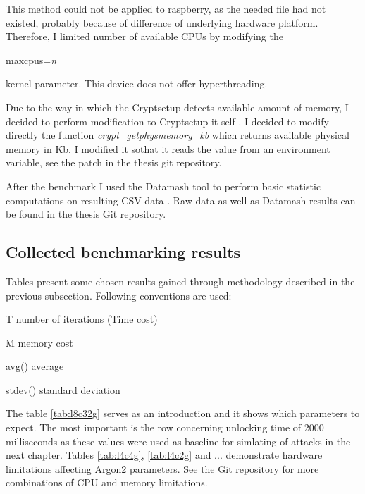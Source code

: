 \documentclass[nolof]{fithesis3}
\begin{document}
This method could not be applied to raspberry, as the needed file had not existed, probably because of difference of underlying hardware platform. Therefore, I limited number of available CPUs by modifying the 
\begin{tt}
maxcpus=\emph{n}
\end{tt}
 kernel parameter. This device does not offer hyperthreading.

Due to the way in which the Cryptsetup detects available amount of memory, I decided to perform modification to Cryptsetup it self \parencite{cryptsetuputils}. I decided to modify directly the function \emph{crypt\_getphysmemory\_kb} which returns available physical memory in Kb. I modified it sothat it reads the value from an environment variable, see the patch in the thesis git repository.

After the benchmark I used the Datamash tool to perform basic statistic computations on resulting CSV data \parencite{datamash}. Raw data as well as Datamash results can be found in the thesis Git repository.

\FloatBarrier

\subsection{Collected benchmarking results}
Tables present some chosen results gained through methodology described in the previous subsection. Following conventions are used:

\begin{description}
\item{T} number of iterations (Time cost)

\item{M} memory cost

\item{avg()} average

\item{stdev()} standard deviation
\end{description}

The table \ref{tab:l8c32g} serves as an introduction and it shows which parameters to expect. The most important is the row concerning unlocking time of 2000 milliseconds as these values were used as baseline for simlating of attacks in the next chapter. Tables \ref{tab:l4c4g}, \ref{tab:l4c2g} and ... demonstrate hardware limitations affecting Argon2 parameters. See the Git repository for more combinations of CPU and memory limitations.
\end{document}
